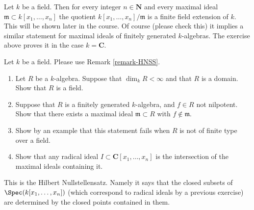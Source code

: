 \begin{remark}
\label{remark-HNSS}
Let $k$ be a field. Then for every integer $n\in {\mathbf N}$ and
every maximal ideal ${\mathfrak m} \subset k[x_1, \ldots, x_n]$
the quotient $k[x_1, \ldots, x_n]/{\mathfrak m}$ is a finite field
extension of $k$. This will be shown later in the course. Of course
(please check this) it implies a similar statement for maximal ideals
of finitely generated $k$-algebras. The exercise above proves
it in the case $k = {\mathbf C}$.
\end{remark}

\begin{exercise}
\label{exercise-Hilbert-Nullstellensatz}
Let $k$ be a field. Please use Remark \ref{remark-HNSS}.
\begin{enumerate}
\item Let $R$ be a $k$-algebra. Suppose that $\dim_k R < \infty$
and that $R$ is a domain. Show that $R$ is a field.
\item Suppose that $R$ is a finitely generated $k$-algebra, and
$f\in R$ not nilpotent. Show that there exists a maximal ideal
${\mathfrak m} \subset R$ with $f\not\in {\mathfrak m}$.
\item Show by an example that this statement fails when $R$
is not of finite type over a field.
\item Show that any radical ideal $I \subset {\mathbf C}[x_1, \ldots, x_n]$
is the intersection of the maximal ideals containing it.
\end{enumerate}
\end{exercise}

\begin{remark}
\label{remark-Hilbert-Nullstellensatz}
This is the Hilbert Nullstellensatz. Namely it says
that the closed subsets of $\Spec(k[x_1, \ldots, x_n])$
(which correspond to radical ideals by a previous exercise)
are determined by the closed points contained in them.
\end{remark}

